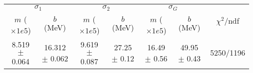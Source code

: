 \begin{tabular}{cc|cc|cc||c}
\multicolumn{2}{c|}{$\sigma_1$} & \multicolumn{2}{|c}{$\sigma_2$} & \multicolumn{2}{|c}{$\sigma_G$}  & \multirow{2}{*}{$\chi^2/$ndf}\\
$m$ ($\times1e5$) & $b$ (MeV) & $m$ ($\times1e5$) & $b$ (MeV) & $m$ ($\times1e5$) & $b$ (MeV) & \\
\hline
8.519 $\pm$ 0.064 & 16.312 $\pm$ 0.062 & 9.619 $\pm$ 0.087 & 27.25 $\pm$ 0.12 & 16.49 $\pm$ 0.56 & 49.95 $\pm$ 0.43 & 5250/1196\\
\end{tabular}
